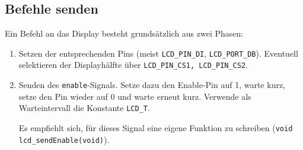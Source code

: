 \subsection*{Befehle senden}
Ein Befehl an das Display besteht grundsätzlich aus zwei Phasen:
\begin{enumerate}
\item Setzen der entsprechenden Pins (meist \lstinline{LCD_PIN_DI}, \lstinline{LCD_PORT_DB}).
	Eventuell selektieren der Displayhälfte über \lstinline{LCD_PIN_CS1, LCD_PIN_CS2}.

\item
Senden des \lstinline{enable}-Signals.
Setze dazu den Enable-Pin auf 1, warte kurz, setze den Pin wieder auf 0 und warte erneut kurz.
Verwende als Warteintervall die Konstante \lstinline{LCD_T}.

Es empfiehlt sich, für dieses Signal eine eigene Funktion zu schreiben (\lstinline{void lcd_sendEnable(void)}).
\end{enumerate}
